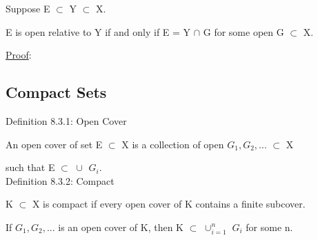 	\begin{adjustbox}{minipage=14cm, right, vspace=0.1cm 0cm}
		Suppose E $\subset$ Y $\subset$ X.

		E is open relative to Y if and only if E = Y $\cap$ G
		for some open G $\subset$ X.
	\end{adjustbox}

{ \color{magenta} \underline{Proof}: }


	





\subsection{ Compact Sets }

{ \color{blue} Definition 8.3.1: Open Cover } 

	\begin{adjustbox}{minipage=14cm, right, vspace=0.1cm 0cm}
		An open cover of set E $\subset$ X is a collection of open $G_1, G_2, ...$
		$\subset$ X
		
		such that E $\subset$ $\cup_{}^{}$ $G_i$. \\
	\end{adjustbox}

{ \color{blue} Definition 8.3.2: Compact } 

	\begin{adjustbox}{minipage=14cm, right, vspace=0.1cm 0cm}
		K $\subset$ X is compact if every open cover
		of K contains a finite subcover.

		\qquad If $G_1, G_2, ...$ is an open cover of K, then
		K $\subset$ $\cup_{i=1}^{n}$ $G_i$ for some n. \\
	\end{adjustbox}


